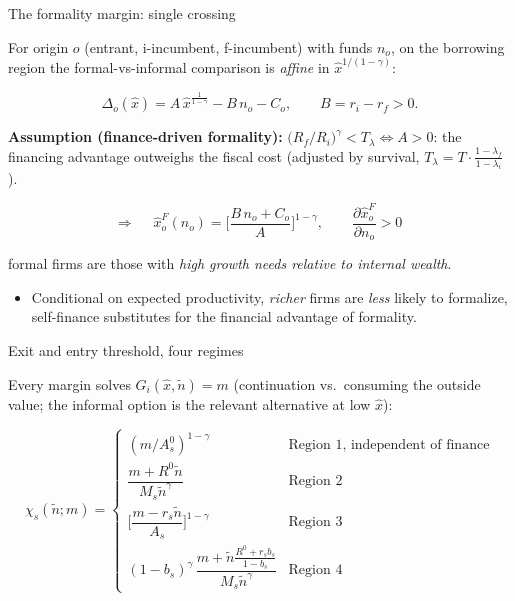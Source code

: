 \documentclass[aspectratio=169]{beamer}
\begin{document}
\begin{frame}[noframenumbering]{The formality margin: single crossing}
\label{formalthresholdcf} 

For origin $o$ (entrant, i-incumbent, f-incumbent) with funds $n_{o}$, on the borrowing region the formal-vs-informal comparison is \emph{affine} in $\hat x^{1/(1-\gamma)}$:

\begin{equation*}
  \Delta_{o}(\hat x)=A\,\hat x^{\frac{1}{1-\gamma}}
  -B\,n_{o}-C_{o},\qquad
  B=r_{i}-r_{f}>0 .
\end{equation*}

\textbf{Assumption (finance-driven formality):} $\big(R_{f}/R_{i}\big)^{\gamma}<T_{\lambda} \iff A>0$: the financing advantage outweighs the fiscal cost (adjusted by survival, $T_{\lambda}=T\cdot \tfrac{1-\lambda_{f}}{1-\lambda_{i}}$).
 
\begin{equation*}
  \Rightarrow\quad \boxed{\;\hat x_o^F(n_{o}) =\Big[\frac{B\,n_{o}+C_{o}}{A}\Big]^{1-\gamma},\qquad \frac{\partial\hat x^F_{o}}{\partial n_{o}}>0\;}
\end{equation*}
 
 formal firms are those with \emph{high growth needs relative to internal wealth}.

\begin{itemize}
    \item Conditional on expected productivity, \emph{richer} firms are \emph{less} likely to formalize, self-finance substitutes for the financial advantage of formality.
\end{itemize}

\hyperlink{threshold}{}

\end{frame}
 

\begin{frame}[noframenumbering]{Exit and entry threshold, four regimes}
\label{entryexitthresholdcf}

Every margin solves $G_{i}(\hat x,\tilde n)=m$
(continuation vs.\ consuming the outside value; the informal option is
the relevant alternative at low $\hat x$):

\begin{equation*}
  \chi_{s}(\tilde n;m)=
  \begin{cases}
    (m/A^{0}_{s})^{1-\gamma} & \text{Region 1, independent of finance}\\[2pt]
    \dfrac{m+R^0 \tilde n}{M_{s}\tilde n^{\gamma}}
      & \text{Region 2}\\[6pt]
    \Big[\dfrac{m-r_{s}\tilde n}{A_{s}}\Big]^{1-\gamma}
      & \text{Region 3}\\[6pt]
    (1-b_{s})^{\gamma}\,
    \dfrac{m+\tilde n\frac{R^0 +r_{s}b_{s}}
    {1-b_{s}}}{M_{s}\tilde n^{\gamma}} & \text{Region 4}
  \end{cases}
\end{equation*}

\hyperlink{threshold}{}

\end{frame}
 
\end{document}
